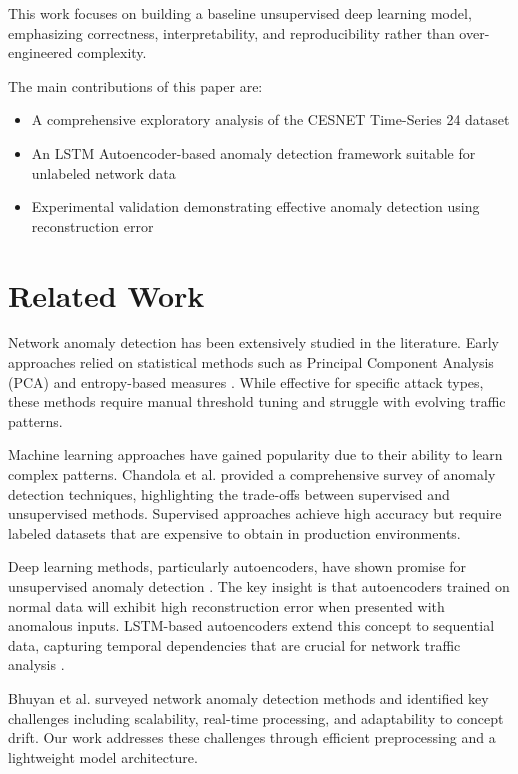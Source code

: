 \documentclass[conference]{IEEEtran}
\begin{document}
This work focuses on building a baseline unsupervised deep learning model, emphasizing correctness, interpretability, and reproducibility rather than over-engineered complexity.

The main contributions of this paper are:
\begin{itemize}
    \item A comprehensive exploratory analysis of the CESNET Time-Series 24 dataset
    \item An LSTM Autoencoder-based anomaly detection framework suitable for unlabeled network data
    \item Experimental validation demonstrating effective anomaly detection using reconstruction error
\end{itemize}

\section{Related Work}
Network anomaly detection has been extensively studied in the literature. Early approaches relied on statistical methods such as Principal Component Analysis (PCA) and entropy-based measures \cite{lakhina2004mining}. While effective for specific attack types, these methods require manual threshold tuning and struggle with evolving traffic patterns.

Machine learning approaches have gained popularity due to their ability to learn complex patterns. Chandola et al. \cite{chandola2009anomaly} provided a comprehensive survey of anomaly detection techniques, highlighting the trade-offs between supervised and unsupervised methods. Supervised approaches achieve high accuracy but require labeled datasets that are expensive to obtain in production environments.

Deep learning methods, particularly autoencoders, have shown promise for unsupervised anomaly detection \cite{erfani2016high}. The key insight is that autoencoders trained on normal data will exhibit high reconstruction error when presented with anomalous inputs. LSTM-based autoencoders extend this concept to sequential data, capturing temporal dependencies that are crucial for network traffic analysis \cite{vinayakumar2019deep}.

Bhuyan et al. \cite{bhuyan2013network} surveyed network anomaly detection methods and identified key challenges including scalability, real-time processing, and adaptability to concept drift. Our work addresses these challenges through efficient preprocessing and a lightweight model architecture.
\end{document}
